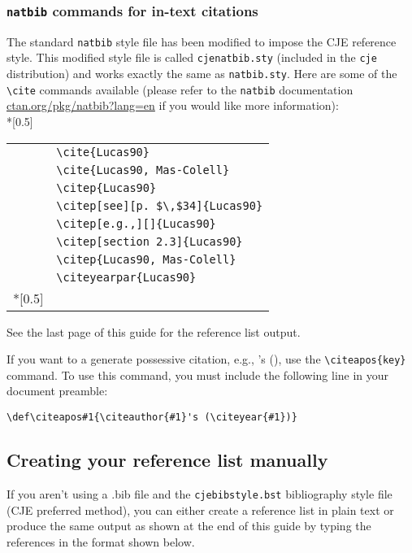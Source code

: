 \documentclass{cje}          %
\theoremstyle{plain}%
\theoremstyle{definition}
\theoremstyle{remark}
\def\citeapos#1{\citeauthor{#1}'s (\citeyear{#1})}
\begin{document}
\subsubsection{\texttt{natbib} commands for in-text citations}
The standard \texttt{natbib} style file has been modified to impose the CJE reference style. This modified style file is called \texttt{cjenatbib.sty} (included in the \texttt{cje} distribution) and works exactly the same as \texttt{natbib.sty}. Here are some of the \verb"\cite" commands  available (please refer to the \texttt{natbib} documentation \href{https://www.ctan.org/pkg/natbib?lang=en}{ctan.org/pkg/natbib?lang=en} if you would like more information):\\*[0.5\baselineskip]
\begin{tabular}{@{}ll}
\cite{Lucas90}
    & \indexsize\verb"\cite{Lucas90}"\\
\cite{Lucas90, Mas-Colell}
    & \indexsize\verb"\cite{Lucas90, Mas-Colell}"\\
\citep{Lucas90}
   & \indexsize\verb"\citep{Lucas90}"\\
\citep[see][p. $\,$34]{Lucas90}
   & \indexsize\verb"\citep[see][p. $\,$34]{Lucas90}"\\
\citep[e.g.,][]{Lucas90}
   & \indexsize\verb"\citep[e.g.,][]{Lucas90}"\\
\citep[section 2.3]{Lucas90}
   & \indexsize\verb"\citep[section 2.3]{Lucas90}"\\
\citep{Lucas90, Mas-Colell}
   & \indexsize\verb"\citep{Lucas90, Mas-Colell}"\\
\citeyearpar{Lucas90}
   & \indexsize\verb"\citeyearpar{Lucas90}"\\*[0.5\baselineskip]
\end{tabular}

\noindent See the last page of this guide for the reference list output.

If you want to a generate possessive citation, e.g., \citeapos{Lucas90}, use the \verb"\citeapos{key}" command.  To use this  command, you must include the following line in your document preamble:

 \verb"\def\citeapos#1{\citeauthor{#1}'s (\citeyear{#1})}"

\subsection{Creating your reference list manually}
If you aren't using a .bib file and the \texttt{cjebibstyle.bst} bibliography style file (CJE preferred method), you can either create a reference list in plain text or produce the same output as shown at the end of this guide by typing the references in the format shown below. \\
\end{document}

